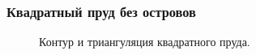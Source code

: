 \documentclass[10pt,utf8,presentation,compress]{beamer}
\begin{document}
\begin{frame}
\frametitle{Квадратный пруд без островов}
	\begin{figure}[H]
		\centering
		\hfill
		\caption{Контур и триангуляция квадратного пруда.}
	\end{figure}
\end{frame}
\end{document}
